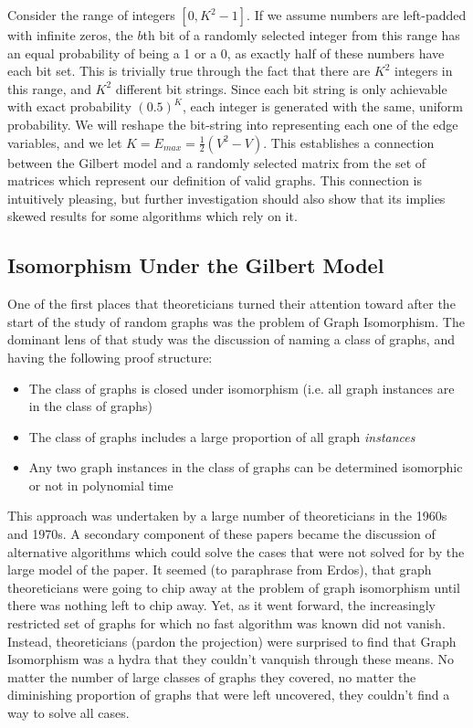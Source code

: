 Consider the range of integers $[0, K^2 - 1]$.
If we assume numbers are left-padded with infinite zeros, the $b$th bit of a randomly selected integer from this range has an equal probability of being a 1 or a 0, as exactly half of these numbers have each bit set.
This is trivially true through the fact that there are $K^2$ integers in this range, and $K^2$ different bit strings.
Since each bit string is only achievable with exact probability $(0.5)^K$, each integer is generated with the same, uniform probability.
We will reshape the bit-string into representing each one of the edge variables, and we let $K = E_{max} = \frac{1}{2}(V^2 - V)$.
This establishes a connection between the Gilbert model and a randomly selected matrix from the set of matrices which represent our definition of valid graphs. 
This connection is intuitively pleasing, but further investigation should also show that its implies skewed results for some algorithms which rely on it.

\subsection{Isomorphism Under the Gilbert Model}

One of the first places that theoreticians turned their attention toward after the start of the study of random graphs was the problem of Graph Isomorphism.
The dominant lens of that study was the discussion of naming a class of graphs, and having the following proof structure:
\begin{itemize}
\item{The class of graphs is closed under isomorphism (i.e. all graph instances are in the class of graphs)}
\item{The class of graphs includes a large proportion of all graph \emph{instances}}
\item{Any two graph instances in the class of graphs can be determined isomorphic or not in polynomial time}
\end{itemize}
This approach was undertaken by a large number of theoreticians in the 1960s and 1970s.
A secondary component of these papers became the discussion of alternative algorithms which could solve the cases that were not solved for by the large model of the paper.
It seemed (to paraphrase from Erdos), that graph theoreticians were going to chip away at the problem of graph isomorphism until there was nothing left to chip away.
Yet, as it went forward, the increasingly restricted set of graphs for which no fast algorithm was known did not vanish.
Instead, theoreticians (pardon the projection) were surprised to find that Graph Isomorphism was a hydra that they couldn't vanquish through these means.
No matter the number of large classes of graphs they covered, no matter the diminishing proportion of graphs that were left uncovered, they couldn't find a way to solve all cases.

